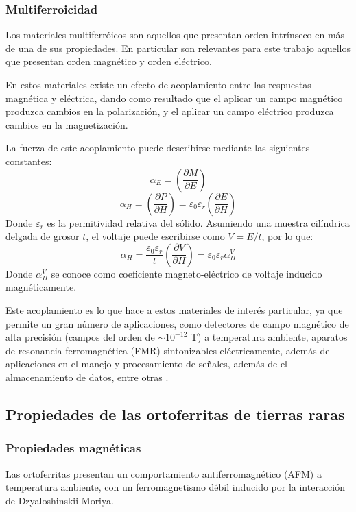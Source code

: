 \documentclass[../main.tex]{subfiles}
\begin{document}
\subsubsection{Multiferroicidad} \label{sec:multif}
Los materiales multiferróicos son aquellos que presentan orden intrínseco en más de una de sus propiedades. En particular son relevantes para este trabajo aquellos que presentan orden magnético y orden eléctrico.

En estos materiales existe un efecto de acoplamiento entre las respuestas magnética y eléctrica, dando como resultado que el aplicar un campo magnético produzca cambios en la polarización, y el aplicar un campo eléctrico produzca cambios en la magnetización.

La fuerza de este acoplamiento puede describirse mediante las siguientes constantes:
\begin{equation}
    \alpha_E=\left(\dfrac{\partial M}{\partial E}\right)
    \label{eq:alphaE}
\end{equation}
\begin{equation}
    \alpha_H=\left(\dfrac{\partial P}{\partial H}\right)=\varepsilon_0\varepsilon_r\left(\dfrac{\partial E}{\partial H}\right)
    \label{eq:alphaH}
\end{equation}
Donde $\varepsilon_r$ es la permitividad relativa del sólido. Asumiendo una muestra cilíndrica delgada de grosor $t$, el voltaje puede escribirse como $V=E/t$, por lo que:
\begin{equation}
    \alpha_H=\dfrac{\varepsilon_0\varepsilon_r}{t}\left(\dfrac{\partial V}{\partial H}\right)=\varepsilon_0\varepsilon_r\alpha_H^V
    \label{eq:alphaHV}
\end{equation}
Donde $\alpha_H^V$ se conoce como coeficiente  magneto-eléctrico de voltaje inducido magnéticamente.

Este acoplamiento es lo que hace a estos materiales de interés particular, ya que permite un gran número de aplicaciones, como detectores de campo magnético de alta precisión (campos del orden de $\sim10^{-12}$ T) a temperatura ambiente, aparatos de resonancia ferromagnética (FMR) sintonizables eléctricamente, además de aplicaciones en el manejo y procesamiento de señales, además de el almacenamiento de datos, entre otras \cite{Vopson2015}.
\subsection{Propiedades de las ortoferritas de tierras raras}
\subsubsection{Propiedades magnéticas}
Las ortoferritas  presentan un comportamiento antiferromagnético (AFM) a temperatura ambiente, con un ferromagnetismo débil inducido por la interacción de Dzyaloshinskii-Moriya.
\end{document}

